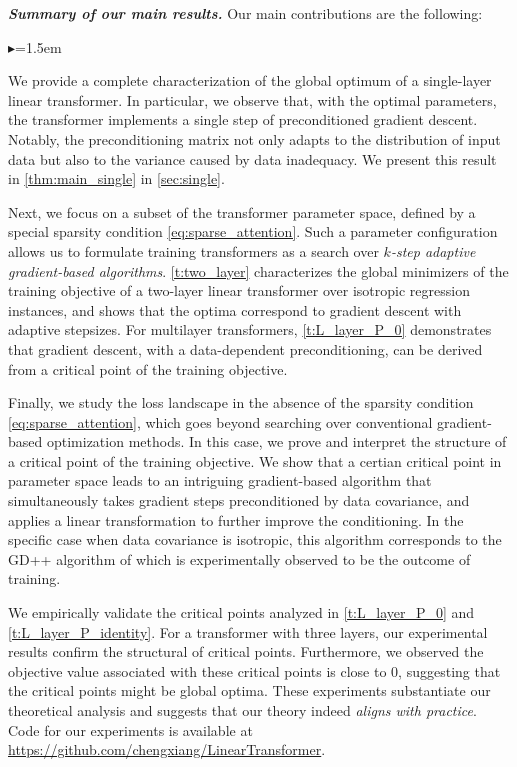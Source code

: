 \documentclass{article}
\newcommand{\emphh}[1]{\textbf{\emph{#1}}}
\begin{document}
\emphh{Summary of our main results.} 
Our main contributions are the following:
\begin{list}{$\blacktriangleright$}{\leftmargin=1.5em}
\vspace*{-6pt}
\setlength{\itemsep}{1pt}
\item We provide a complete characterization of the global optimum of a single-layer linear transformer. In particular, we observe that, with the optimal parameters, the transformer implements a single step of preconditioned gradient descent. Notably, the preconditioning matrix not only adapts to the distribution of input data but also to the variance caused by data inadequacy. We present this result in \autoref{thm:main_single} in \autoref{sec:single}.

\item Next, we focus on a subset of the transformer parameter space, defined by a special sparsity condition \eqref{eq:sparse_attention}. Such a parameter configuration allows us to formulate training transformers as a search over \emph{$k$-step adaptive gradient-based algorithms}. \autoref{t:two_layer} characterizes the global minimizers of the training objective of a two-layer linear transformer over isotropic regression instances, and shows that the optima correspond to gradient descent with adaptive stepsizes. For multilayer transformers, \autoref{t:L_layer_P_0} demonstrates that gradient descent, with a data-dependent preconditioning, can be derived from a critical point of the training objective. 

\item Finally, we study the loss landscape in the absence of the sparsity condition \eqref{eq:sparse_attention}, which goes beyond searching over conventional gradient-based optimization methods. In this case, we prove and interpret the structure of a critical point of the training objective. We show that a certian critical point in parameter space leads to an intriguing gradient-based algorithm that simultaneously takes gradient steps preconditioned by data covariance, and applies a linear transformation to further improve the conditioning. In the specific case when data covariance is isotropic, this algorithm corresponds to the GD++ algorithm of \citet{von2022transformers} which is  experimentally observed to be the outcome of training. 

\end{list}
We empirically validate the critical points analyzed in \autoref{t:L_layer_P_0} and \autoref{t:L_layer_P_identity}.
For a transformer with three layers, our experimental results confirm the structural of critical points. Furthermore, we observed the objective value associated with these critical points is close to $0$, suggesting that the critical points might be global optima. These experiments substantiate our theoretical analysis and suggests that our theory indeed \emph{aligns with practice}.  Code for our experiments is available at \url{https://github.com/chengxiang/LinearTransformer}.
\end{document}
